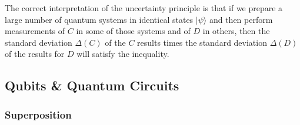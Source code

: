 \documentclass{article}
\theoremstyle{definition}
\begin{document}
The correct interpretation of the uncertainty principle is that if we prepare a large number of quantum systems in identical states $|\psi \rangle$ and then perform measurements of $C$ in some of those systems and of $D$ in others, then the standard deviation $\Delta (C)$ of the $C$ results times the standard deviation $\Delta(D)$ of the results for $D$ will satisfy the inequality.


\subsection*{Qubits \& Quantum Circuits}

\subsubsection*{Superposition}
\end{document}
